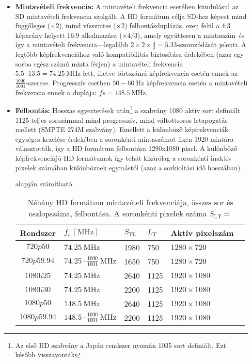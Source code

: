 \begin{itemize}
\item \textbf{Mintavételi frekvencia:}
A mintavételi frekvencia esetében kiindulásul az SD mintavételi frekvencia szolgált.
A HD formátum célja SD-hez képest mind függőleges ($\times 2$), mind vízszintes ($\times 2$) felbontásduplázás, ezen felül a 4:3 képarány helyett 16:9 alkalmazása ($\times 4/3$), amely együttesen a mintaszám--és így a mintavételi frekvencia---legalább $2\times 2 \times \frac{4}{3} = 5.33$-szorozódását jelenti.
A legtöbb képfrekvenciához való kompatibilitás biztosítása érdekében (azaz egy sorba egész számú minta férjen) a mintavételi frekvencia $5.5 \cdot 13.5 = 74.25~\mathrm{MHz}$ lett, illetve törtszámú képfrekvencia esetén ennek az $\frac{1000}{1001}$-szerese.
Progresszív esetben $50-60~\mathrm{Hz}$ képfrekvencia esetén a mintavételi frekvencia ennek a duplája: $fs = 148.5~\mathrm{MHz}$.
\item \textbf{Felbontás:} Hosszas egyeztetések után\footnote{Az első HD szabvány a Japán rendszer nyomán 1035 sort definiált. Ezt később visszavonták} a szabvány 1080 aktív sort definiált 1125 teljes sorszámmal mind progresszív, mind váltottsoros letapogatás mellett (SMPTE 274M szabvány).
Emellett a különböző képfrekvenciák egységes kezelése érdekében a soronkénti mintaszámot fixen 1920 mintára választották, így a HD formátum felbontása 1290x1080 pixel.
A különböző képfrekvenciájú HD formátumok így tehát kizárólag a soronkénti inaktív pixelek számában különböznek egymástól (azaz a sorkioltási idő hosszában).

\begin{table}[h!]
\caption{Néhány HD formátum mintavételi frekvenciája, összes sor és oszlopszáma, felbontása. 
A soronkénti pixelek száma $S_{\mathrm{LT}} = $} alapján számítható.
\renewcommand*{\arraystretch}{2.25}
\label{tab:viewing_dist}
\begin{center}
    \begin{tabular}[h!]{ @{}c | l | l | l | l | l @{} }%
		Rendszer     &   $f_s \, [\mathrm{MHz}]$ 				& $S_{TL}$ & $L_T$ & Aktív pixelszám \\ \hline
		$720p50$     &   $74.25~\mathrm{MHz}$    				& 1980     &  750  & $1280 \times 720$ \\
		$720p59.94$  &$74.25\cdot\frac{1000}{1001}~\mathrm{MHz}$& 1650     &  750  & $1280 \times 720$ \\
		$1080i25$ 	 &   $74.25~\mathrm{MHz}$    				& 2640     & 1125  & $1920 \times 1080$ \\
		$1080i30$  	 &   $74.25~\mathrm{MHz}$    				& 2200     & 1125  & $1920 \times 1080$ \\
		$1080p50$ 	 &   $148.5~\mathrm{MHz}$    		    	& 2640     & 1125  & $1920 \times 1080$ \\
		$1080p59.94$ &$148.5\cdot\frac{1000}{1001}~\mathrm{MHz}$& 2200     & 1125  & $1920 \times 1080$ 
        \end{tabular}
\end{center}
\end{table}


\end{itemize}
